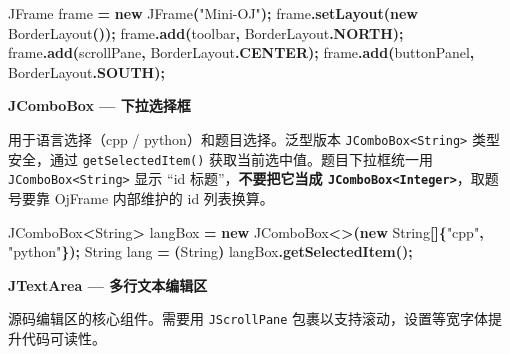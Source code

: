 \documentclass[
  11pt,
]{ctexart}
\newenvironment{Shaded}{\begin{snugshade}}{\end{snugshade}}
\newcommand{\BuiltInTok}[1]{#1}
\newcommand{\FunctionTok}[1]{\textcolor[rgb]{0.13,0.29,0.53}{\textbf{#1}}}
\newcommand{\KeywordTok}[1]{\textcolor[rgb]{0.13,0.29,0.53}{\textbf{#1}}}
\newcommand{\NormalTok}[1]{#1}
\newcommand{\OperatorTok}[1]{\textcolor[rgb]{0.81,0.36,0.00}{\textbf{#1}}}
\newcommand{\StringTok}[1]{\textcolor[rgb]{0.31,0.60,0.02}{#1}}
\begin{document}
\begin{Shaded}
\begin{Highlighting}[]
\BuiltInTok{JFrame}\NormalTok{ frame }\OperatorTok{=} \KeywordTok{new} \BuiltInTok{JFrame}\OperatorTok{(}\StringTok{"Mini{-}OJ"}\OperatorTok{);}
\NormalTok{frame}\OperatorTok{.}\FunctionTok{setLayout}\OperatorTok{(}\KeywordTok{new} \BuiltInTok{BorderLayout}\OperatorTok{());}
\NormalTok{frame}\OperatorTok{.}\FunctionTok{add}\OperatorTok{(}\NormalTok{toolbar}\OperatorTok{,} \BuiltInTok{BorderLayout}\OperatorTok{.}\FunctionTok{NORTH}\OperatorTok{);}
\NormalTok{frame}\OperatorTok{.}\FunctionTok{add}\OperatorTok{(}\NormalTok{scrollPane}\OperatorTok{,} \BuiltInTok{BorderLayout}\OperatorTok{.}\FunctionTok{CENTER}\OperatorTok{);}
\NormalTok{frame}\OperatorTok{.}\FunctionTok{add}\OperatorTok{(}\NormalTok{buttonPanel}\OperatorTok{,} \BuiltInTok{BorderLayout}\OperatorTok{.}\FunctionTok{SOUTH}\OperatorTok{);}
\end{Highlighting}
\end{Shaded}

\textbf{JComboBox --- 下拉选择框}

用于语言选择（cpp / python）和题目选择。泛型版本
\texttt{JComboBox\textless{}String\textgreater{}} 类型安全，通过
\texttt{getSelectedItem()} 获取当前选中值。题目下拉框统一用
\texttt{JComboBox\textless{}String\textgreater{}} 显示 ``id
标题''，\textbf{不要把它当成
\texttt{JComboBox\textless{}Integer\textgreater{}}}，取题号要靠 OjFrame
内部维护的 id 列表换算。

\begin{Shaded}
\begin{Highlighting}[]
\BuiltInTok{JComboBox}\OperatorTok{\textless{}}\BuiltInTok{String}\OperatorTok{\textgreater{}}\NormalTok{ langBox }\OperatorTok{=} \KeywordTok{new} \BuiltInTok{JComboBox}\OperatorTok{\textless{}\textgreater{}(}\KeywordTok{new} \BuiltInTok{String}\OperatorTok{[]\{}\StringTok{"cpp"}\OperatorTok{,} \StringTok{"python"}\OperatorTok{\});}
\BuiltInTok{String}\NormalTok{ lang }\OperatorTok{=} \OperatorTok{(}\BuiltInTok{String}\OperatorTok{)}\NormalTok{ langBox}\OperatorTok{.}\FunctionTok{getSelectedItem}\OperatorTok{();}
\end{Highlighting}
\end{Shaded}

\textbf{JTextArea --- 多行文本编辑区}

源码编辑区的核心组件。需要用 \texttt{JScrollPane}
包裹以支持滚动，设置等宽字体提升代码可读性。
\end{document}
